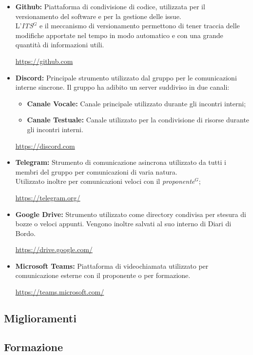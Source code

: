         \begin{itemize}
            \item \textbf{Github:} Piattaforma di condivisione di codice, utilizzata per il versionamento del software e per la gestione delle issue.\\
            L'\emph{ITS}$^{G}$ e il meccanismo di versionamento permettono di tener traccia delle modifiche apportate nel tempo in modo automatico e con una grande quantità di informazioni utili.
            \begin{center}
                \url{https://github.com}
            \end{center}
            \item \textbf{Discord:} Principale strumento utilizzato dal gruppo per le comunicazioni interne sincrone. 
                Il gruppo ha adibito un server suddiviso in due canali:
                \begin{itemize}
                    \item \textbf{Canale Vocale:} Canale principale utilizzato durante gli incontri interni;
                    \item \textbf{Canale Testuale:} Canale utilizzato per la condivisione di risorse durante gli incontri interni.
                \end{itemize}
                \begin{center}
                    \url{https://discord.com}
                \end{center}
            \item \textbf{Telegram:} Strumento di comunicazione asincrona utilizzato da tutti i membri del gruppo per comunicazioni di varia natura.\\
                    Utilizzato inoltre per comunicazioni veloci con il \emph{proponente}$^{G}$;
                    \begin{center}
                        \url{https://telegram.org/}
                    \end{center}
            \item \textbf{Google Drive:} Strumento utilizzato come directory condivisa per stesura di bozze o veloci appunti.
            Vengono inoltre salvati al suo interno di Diari di Bordo.
                \begin{center}
                    \url{https://drive.google.com/}
                \end{center}
           \item \textbf{Microsoft Teams:} Piattaforma di videochiamata utilizzato per comunicazione esterne con il proponente o per formazione.
           \begin{center}
            \url{https://teams.microsoft.com/}
           \end{center}
        \end{itemize}
        
        \subsection{Miglioramenti}

        \subsection{Formazione}
        
